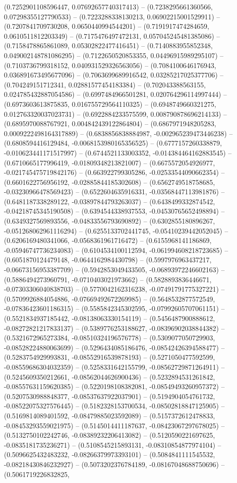 (0.7252901108596447, 0.07692657740317413) -- (0.7238295661360566, 0.07298355127790533) -- (0.7223288338130213, 0.06902215001529911) -- (0.7207841709730208, 0.0650440994544201) -- (0.7191917474284659, 0.0610511812203349) -- (0.7175476497472131, 0.057045245481385086) -- (0.7158478865861089, 0.05302822477416451) -- (0.7140883955852348, 0.049002148781086295) -- (0.7122650520853355, 0.04496915989295107) -- (0.7103736799318152, 0.040931529326563056) -- (0.7084100646176943, 0.036891673495677096) -- (0.7063699689916542, 0.03285217025377706) -- (0.704249151712341, 0.02881577454183384) -- (0.702043388563155, 0.024785432887054586) -- (0.6997484966501281, 0.020764296114997444) -- (0.6973603613875835, 0.016755729564110325) -- (0.6948749660321275, 0.012763320037023731) -- (0.6922884233575599, 0.008790878696214133) -- (0.6895970088767921, 0.004842439122864804) -- (0.6867971948205283, 0.0009222498164317889) -- (0.6838856838884987, -0.002965239473446238) -- (0.6808594416129484, -0.0068153980165356525) -- (0.6777157260338879, -0.010623441171517997) -- (0.6744521133003352, -0.014384464162883545) -- (0.6710665177996419, -0.01809348213821007) -- (0.6675572054926977, -0.021745475719842176) -- (0.663922799305286, -0.02533544090662354) -- (0.6601622756956192, -0.02885844185302608) -- (0.6562749518758685, -0.03230966478569423) -- (0.6522604635916331, -0.03568447113981876) -- (0.6481187338289122, -0.03897844793263037) -- (0.6438499332874542, -0.04218745345190508) -- (0.6394544338937553, -0.04530765652498894) -- (0.6349327569893556, -0.04833556793690892) -- (0.6302855180896267, -0.051268062961116294) -- (0.6255133702441745, -0.05410239442052045) -- (0.6206169480341066, -0.0568361961716472) -- (0.6155968141186869, -0.05946747736234083) -- (0.6104534100112594, -0.061994608218723685) -- (0.6051870124479148, -0.0644162984430798) -- (0.5997976963437217, -0.06673156953387709) -- (0.5942853049433505, -0.06893972246602163) -- (0.5886494273960791, -0.0710403021973662) -- (0.5828893836446671, -0.07303306040838703) -- (0.5770042162316238, -0.07491791775327221) -- (0.5709926884054886, -0.07669492672269985) -- (0.5648532877572549, -0.07836423601186315) -- (0.5585842345302595, -0.07992605707061151) -- (0.5521834937185442, -0.08138063330154119) -- (0.5456487900888612, -0.08272821217833137) -- (0.5389776253188627, -0.08396902038844382) -- (0.5321672965273384, -0.08510324196576778) -- (0.5309077050729903, -0.08528224880063699) -- (0.5296434085186476, -0.08542426394588477) -- (0.5283754929993831, -0.08552916539878193) -- (0.5271050477592599, -0.08559686304032359) -- (0.5258331642155799, -0.08562729871264911) -- (0.5245609350212661, -0.08562044626900436) -- (0.5232894531261842, -0.08557631159620385) -- (0.5220198108382081, -0.08549493260957372) -- (0.5207530988848377, -0.08537637922037901) -- (0.5194904054761732, -0.08522075327576445) -- (0.5182328153700534, -0.08502818847125905) -- (0.5169814089401592, -0.08479885023592089) -- (0.5157372612478833, -0.08453293559021975) -- (0.5145014411187637, -0.08423067297678025) -- (0.5132750102242746, -0.08389232206413082) -- (0.5120590221697625, -0.0835181735236271) -- (0.5108545215893131, -0.08310854877974104) -- (0.5096625432483232, -0.08266379973393101) -- (0.5084841111545532, -0.08218430846232927) -- (0.5073202376784189, -0.08167048688750696) -- (0.5061719226832825, 